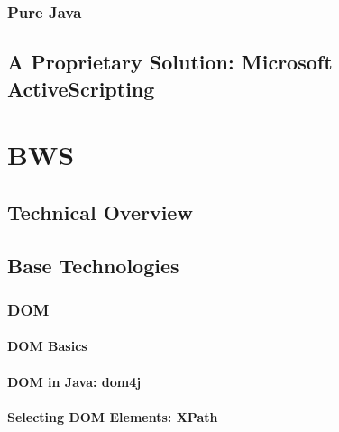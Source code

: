   \subsection{Pure Java}
  
   
    
  \section{A Proprietary Solution: Microsoft ActiveScripting}
  \label{sec:activescripting}
    
   
     
\chapter{BWS}

 

 \section{Technical Overview}
  
  
  
 \section{Base Technologies}
 \label{sec:BaseTechnologies}
  
  
  
  \subsection{DOM}
  
   
   
   \subsubsection{DOM Basics}
   
    
    
   \subsubsection{DOM in Java: dom4j}
    
    
    
   \subsubsection{Selecting DOM Elements: XPath}
    \label{sec:SelectingDOMElementsXPath}
    
   
